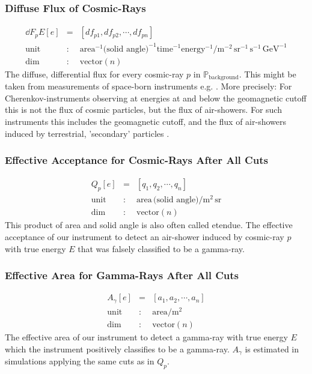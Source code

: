 \documentclass{article}%
\begin{document}
\subsubsection*{Diffuse Flux of Cosmic-Rays}
%
\begin{eqnarray*}
\dd{F_p}{E}[e] &=& [df_{p1}, df_{p2}, \cdots, df_{pn}]\\
\text{unit} &:& \text{area}^{-1} \text{(solid angle)}^{-1} \text{time}^{-1} \text{energy}^{-1} / \text{m}^{-2}\, \text{sr}^{-1}\,\text{s}^{-1}\,\text{GeV}^{-1}\\
\text{dim} &:& \text{vector}(n)
\end{eqnarray*}
%
The diffuse, differential flux for every cosmic-ray $p$ in $\mathbb{P}_\text{background}$. This might be taken from measurements of space-born instruments e.g. \cite{aguilar2014precision,aguilar2015precision}.
%
More precisely: For Cherenkov-instruments observing at energies at and below the geomagnetic cutoff this is not the flux of cosmic particles, but the flux of air-showers.
%
For such instruments this includes the geomagnetic cutoff, and the flux of air-showers induced by terrestrial, 'secondary' particles \cite{lipari2002fluxes}.
%
\subsubsection*{Effective Acceptance for Cosmic-Rays After All Cuts}
\begin{eqnarray*}
Q_p[e] &=& [q_1, q_2, \cdots, q_n]\\
\text{unit} &:& \text{area} \, \text{(solid angle)} / \text{m}^{2}\,\text{sr}\\
\text{dim} &:& \text{vector}(n)
\end{eqnarray*}
%
This product of area and solid angle is also often called etendue.
%
The effective acceptance of our instrument to detect an air-shower induced by cosmic-ray $p$ with true energy $E$ that was falsely classified to be a gamma-ray.
%
\subsubsection*{Effective Area for Gamma-Rays After All Cuts}
\begin{eqnarray*}
A_\gamma[e] &=& [a_1, a_2, \cdots, a_n]\\
\text{unit} &:& \text{area} / \text{m}^{2}\\
\text{dim} &:& \text{vector}(n)
\end{eqnarray*}
%
The effective area of our instrument to detect a gamma-ray with true energy $E$ which the instrument positively classifies to be a gamma-ray.
%
$A_\gamma$ is estimated in simulations applying the same cuts as in $Q_p$.
%
\end{document}
